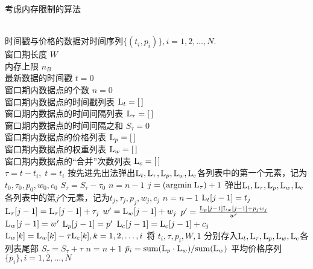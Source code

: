 \documentclass[titlepage=false]{ctexart}
\begin{document}
\begin{algorithm}
	\caption{考虑内存限制的算法}
	\label{algo:memlimit}
	\begin{algorithmic}[1]
        \REQUIRE ~\\
            时间戳与价格的数据对时间序列$\{(t_i,p_i)\},i=1,2,\dots,N$.\\  %
            窗口期长度 $W$\\
            内存上限 $n_B$
		\ENSURE ~\\           %
            最新数据的时间戳 $t=0$\\
            窗口期内数据点的个数 $n=0$\\
            窗口期内数据点的时间戳列表 ${\rm L}_t=[\,]$\\
            窗口期内数据点的时间间隔列表 ${\rm L}_{\tau}=[\,]$\\
            窗口期内数据点的时间间隔之和 $S_{\tau}=0$\\
            窗口期内数据点的价格列表 ${\rm L}_p=[\,]$\\
            窗口期内数据点的权重列表 ${\rm L}_w=[\,]$\\
            窗口期内数据点的“合并”次数列表 ${\rm L}_c=[\,]$\\
        \STATE $\tau=t-t_i,\;t=t_i$
            \STATE 按先进先出法弹出${\rm L}_{t},{\rm L}_{\tau},{\rm L}_{p},{\rm L}_{w},{\rm L}_{c}$各列表中的第一个元素，记为$t_0,\tau_0,p_0,w_0,c_0$
            \STATE $S_{\tau} = S_{\tau}-\tau_0$
            \STATE $n = n-1$
		\ENDWHILE
            \STATE $j = ({\rm argmin}\; {\rm L}_{\tau})+1$
            \STATE 弹出${\rm L}_{t},{\rm L}_{\tau},{\rm L}_{p},{\rm L}_{w},{\rm L}_{c}$各列表中的第$j$个元素，记为$t_j,\tau_j,p_j,w_j,c_j$
            \STATE $n=n-1$
            \STATE ${\rm L}_{t}[j-1] = t_j$
            \STATE ${\rm L}_{\tau}[j-1] = {\rm L}_{\tau}[j-1]+\tau_j$
            \STATE $w' = {\rm L}_{w}[j-1]+w_j$
            \STATE $p' = \frac{ {\rm L}_{p}[j-1]{\rm L}_{w}[j-1]+ p_jw_j}{w'}$
            \STATE ${\rm L}_{w}[j-1] = w'$
            \STATE ${\rm L}_{p}[j-1] = p'$
            \STATE ${\rm L}_{c}[j-1] = {\rm L}_{c}[j-1]+c_j$
        \ENDIF
        \STATE ${\rm L}_{w}[k] = {\rm L}_{w}[k]-\tau{\rm L}_{c}[k],k=1,2,\dots,i$
        \STATE 将 $t_i,\tau,p_i,W,1$ 分别存入${\rm L}_{t},{\rm L}_{\tau},{\rm L}_{p},{\rm L}_{w},{\rm L}_{c}$各列表尾部
        \STATE $S_{\tau} = S_{\tau}+\tau$
        \STATE $n = n+1$
        \STATE $\bar{p}_i={{\rm sum}({\rm L}_{p}\cdot{\rm L}_{w})}/{{\rm sum}({\rm L}_{w})}$
        \ENDFOR
        \RETURN 平均价格序列$\{\bar{p}_i\},i=1,2,\dots,N$
	\end{algorithmic}
\end{algorithm}
\end{document}
